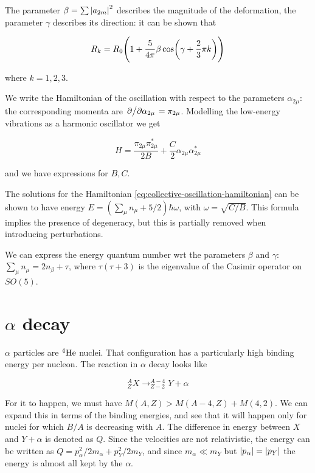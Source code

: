 \documentclass[main.tex]{subfiles}
\begin{document}
The parameter \(\beta = \sum  \abs{a_{2m}}^2  \) describes the magnitude of the deformation, the parameter \(\gamma\) describes its direction: it can be shown that

\begin{equation}
    R_k = R_0 \qty(1+\frac{5}{4 \pi} \beta \cos(\gamma + \frac{2}{3} \pi k) )
\end{equation}

where \(k = 1, 2, 3\).

We write the Hamiltonian of the oscillation with respect to the parameters \(\alpha_{2\mu}\): the corresponding momenta are \(\pdv*{}{\alpha_{2\mu}} = \pi_{2\mu}\). Modelling the low-energy vibrations as a harmonic oscillator we get

\begin{equation} \label{eq:collective-oscillation-hamiltonian}
    H = \frac{\pi_{2\mu} \pi_{2\mu}^*}{2B} + \frac{C}{2} \alpha_{2\mu} \alpha_{2\mu}^*
\end{equation}

and we have expressions for \(B, C\).

The solutions for the Hamiltonian \eqref{eq:collective-oscillation-hamiltonian} can be shown to have energy \(E = (\sum_\mu n_\mu + 5/2) \hbar \omega\), with \(\omega = \sqrt{C/B}\). This formula implies the presence of degeneracy, but this is partially removed when introducing perturbations.

We can express the energy quantum number wrt the parameters \(\beta\) and \(\gamma\): \(\sum _{\mu}  n_\mu = 2n_\beta + \tau \), where \(\tau (\tau+3)\) is the eigenvalue of the Casimir operator on \(SO(5)\).

\section{\(\alpha\) decay}

\(\alpha\) particles are \(^{4} \ce{He} \) nuclei. That configuration has a particularly high binding energy per nucleon. The reaction in \(\alpha\) decay looks like

\begin{equation}
    ^{A} _Z X \rightarrow ^{A-4} _{Z-2} Y + \alpha
\end{equation}

For it to happen, we must have \(M(A, Z) > M(A-4, Z) + M(4, 2)\). We can expand this in terms of the binding energies, and see that it will happen only for nuclei for which \(B/A\) is decreasing with \(A\). The difference in energy between \(X\) and \(Y + \alpha\) is denoted as \(Q\). Since the velocities are not relativistic, the energy can be written as \(Q = p_\alpha^2 /2m_\alpha + p_Y^2 /2m_Y\), and since \(m_\alpha \ll m_Y\) but \(\abs{p_\alpha} = \abs{p_Y}\) the energy is almost all kept by the \(\alpha\).
\end{document}
